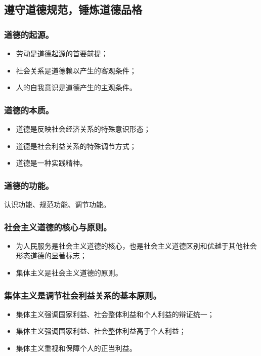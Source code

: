 \documentclass{article}
\begin{document}
\subsection{遵守道德规范，锤炼道德品格}

\subsubsection{道德的起源。}
\begin{itemize}
    \item 劳动是道德起源的首要前提；
    \item 社会关系是道德赖以产生的客观条件；
    \item 人的自我意识是道德产生的主观条件。
\end{itemize}

\subsubsection{道德的本质。}
\begin{itemize}
    \item 道德是反映社会经济关系的特殊意识形态；
    \item 道德是社会利益关系的特殊调节方式；
    \item 道德是一种实践精神。
\end{itemize}

\subsubsection{道德的功能。}
认识功能、规范功能、调节功能。

\subsubsection{社会主义道德的核心与原则。}
\begin{itemize}
    \item 为人民服务是社会主义道德的核心，也是社会主义道德区别和优越于其他社会形态道德的显著标志；
    \item 集体主义是社会主义道德的原则。
\end{itemize}

\subsubsection{集体主义是调节社会利益关系的基本原则。}
\begin{itemize}
    \item 集体主义强调国家利益、社会整体利益和个人利益的辩证统一；
    \item 集体主义强调国家利益、社会整体利益高于个人利益；
    \item 集体主义重视和保障个人的正当利益。
\end{itemize}
\end{document}
